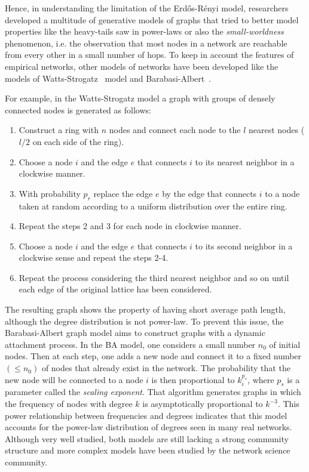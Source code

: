 Hence, in understanding the limitation of the Erd\H{o}s-Rényi model, researchers developed a multitude of generative models of graphs that tried to better model properties like the heavy-tails saw in power-laws or also the \emph{small-worldness} phenomenon, i.e.
the observation that most nodes in a network are reachable from every other in a small number of hops.
To keep in account the features of empirical networks, other models of networks have been developed like the models of Watts-Strogatz~\cite{watts1998} model and Barabasi-Albert~\cite{barabasi1999}.

For example, in the Watts-Strogatz model a graph with groups of densely connected nodes is generated as follows:
\begin{enumerate}
\item Construct a ring with $n$ nodes and connect each node to the $l$ nearest nodes ($l/2$ on each side of the ring).
\item Choose a node $i$ and the edge $e$ that connects $i$ to its nearest neighbor in a clockwise manner.
\item With probability $p_r$ replace the edge $e$ by the edge that connects $i$ to a node taken at random according to a uniform distribution over the entire ring.
\item Repeat the steps 2 and 3 for each node in clockwise manner.
\item Choose a node $i$ and the edge $e$ that connects $i$ to its second neighbor in a clockwise sense and repeat the steps 2-4.
\item Repeat the process considering the third nearest neighbor and so on until each edge of the original lattice has been considered.
\end{enumerate}

The resulting graph shows the property of having short average path length, although the degree distribution is not power-law.
To prevent this issue, the Barabasi-Albert graph model aims to construct graphs with a dynamic attachment process.
In the BA model, one considers a small number $n_0$ of initial nodes.
Then at each step, one adds a new node and connect it to a fixed number $(\leq n_0)$ of nodes that already exist in the network.
The probability that the new node will be connected to a node $i$ is then proportional to $k_i^{p_s}$,  where $p_s$ is a parameter called the \emph{scaling exponent}.
That algorithm generates graphs in which the frequency of nodes with degree $k$ is asymptotically proportional to ${k}^{-3}$.
This power relationship between frequencies and degrees indicates that this model accounts for the power-law distribution of degrees seen in many real networks.
Although very well studied, both models are still lacking a strong community structure and more complex models have been studied by the network science community.

